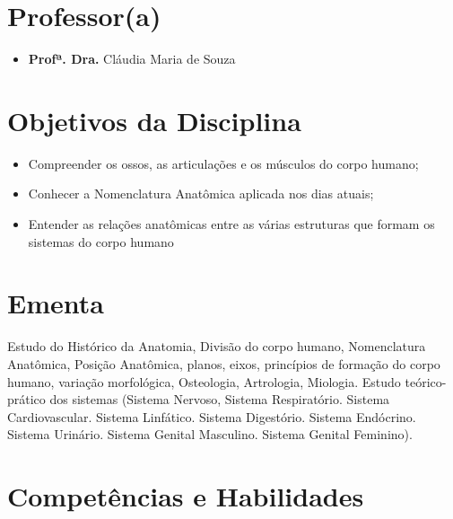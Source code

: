 \documentclass[
]{book}
\providecommand{\tightlist}{%
  \setlength{\itemsep}{0pt}\setlength{\parskip}{0pt}}
\begin{document}
\hypertarget{professora}{%
\section{Professor(a)}\label{professora}}

\begin{itemize}
\tightlist
\item
  \textbf{Profª. Dra.} Cláudia Maria de Souza
\end{itemize}

\hypertarget{objetivos-da-disciplina}{%
\section{Objetivos da Disciplina}\label{objetivos-da-disciplina}}

\begin{itemize}
\tightlist
\item
  Compreender os ossos, as articulações e os músculos do corpo humano;
\item
  Conhecer a Nomenclatura Anatômica aplicada nos dias atuais;
\item
  Entender as relações anatômicas entre as várias estruturas que formam os sistemas do corpo humano
\end{itemize}

\hypertarget{ementa}{%
\section{Ementa}\label{ementa}}

Estudo do Histórico da Anatomia, Divisão do corpo humano, Nomenclatura Anatômica, Posição Anatômica, planos, eixos, princípios de formação do corpo humano, variação morfológica, Osteologia, Artrologia, Miologia. Estudo teórico-prático dos sistemas (Sistema Nervoso, Sistema Respiratório. Sistema Cardiovascular. Sistema Linfático. Sistema Digestório. Sistema Endócrino. Sistema Urinário. Sistema Genital Masculino. Sistema Genital Feminino).

\hypertarget{competuxeancias-e-habilidades}{%
\section{Competências e Habilidades}\label{competuxeancias-e-habilidades}}
\end{document}
